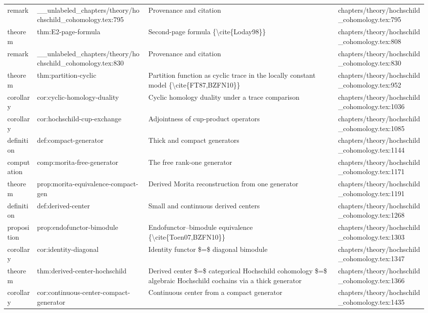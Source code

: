 \documentclass[11pt]{article}
\begin{document}
\begin{longtable}{L{0.10\textwidth}L{0.26\textwidth}L{0.42\textwidth}L{0.22\textwidth}}
remark & \_\_unlabeled\_chapters/theory/hochschild\_cohomology.tex:795 & Provenance and citation & chapters/theory/hochschild\_cohomology.tex:795\\
theorem & thm:E2-page-formula & Second-page formula \{\textbackslash{}cite\{Loday98\}\} & chapters/theory/hochschild\_cohomology.tex:808\\
remark & \_\_unlabeled\_chapters/theory/hochschild\_cohomology.tex:830 & Provenance and citation & chapters/theory/hochschild\_cohomology.tex:830\\
theorem & thm:partition-cyclic & Partition function as cyclic trace in the locally constant model \{\textbackslash{}cite\{FT87,BZFN10\}\} & chapters/theory/hochschild\_cohomology.tex:952\\
corollary & cor:cyclic-homology-duality & Cyclic homology duality under a trace comparison & chapters/theory/hochschild\_cohomology.tex:1036\\
corollary & cor:hochschild-cup-exchange & Adjointness of cup-product operators & chapters/theory/hochschild\_cohomology.tex:1085\\
definition & def:compact-generator & Thick and compact generators & chapters/theory/hochschild\_cohomology.tex:1144\\
computation & comp:morita-free-generator & The free rank-one generator & chapters/theory/hochschild\_cohomology.tex:1171\\
theorem & prop:morita-equivalence-compact-gen & Derived Morita reconstruction from one generator & chapters/theory/hochschild\_cohomology.tex:1191\\
definition & def:derived-center & Small and continuous derived centers & chapters/theory/hochschild\_cohomology.tex:1268\\
proposition & prop:endofunctor-bimodule & Endofunctor--bimodule equivalence \{\textbackslash{}cite\{Toen07,BZFN10\}\} & chapters/theory/hochschild\_cohomology.tex:1303\\
corollary & cor:identity-diagonal & Identity functor \$=\$ diagonal bimodule & chapters/theory/hochschild\_cohomology.tex:1347\\
theorem & thm:derived-center-hochschild & Derived center \$=\$ categorical Hochschild cohomology \$=\$ algebraic Hochschild cochains via a thick generator & chapters/theory/hochschild\_cohomology.tex:1366\\
corollary & cor:continuous-center-compact-generator & Continuous center from a compact generator & chapters/theory/hochschild\_cohomology.tex:1435\\

\end{longtable}
\end{document}

